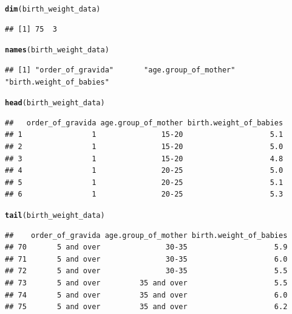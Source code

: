 \documentclass[11pt, a4paper]{article}\usepackage[]{graphicx}\usepackage[]{xcolor}
\makeatletter
\newcommand{\hlstd}[1]{\textcolor[rgb]{0.345,0.345,0.345}{#1}}%
\newcommand{\hlkwd}[1]{\textcolor[rgb]{0.737,0.353,0.396}{\textbf{#1}}}%
\newenvironment{kframe}{%
 \def\at@end@of@kframe{}%
 \ifinner\ifhmode%
  \def\at@end@of@kframe{\end{minipage}}%
  \begin{minipage}{\columnwidth}%
 \fi\fi%
 \def\FrameCommand##1{\hskip\@totalleftmargin \hskip-\fboxsep
 \colorbox{shadecolor}{##1}\hskip-\fboxsep
     \hskip-\linewidth \hskip-\@totalleftmargin \hskip\columnwidth}%
 \MakeFramed {\advance\hsize-\width
   \@totalleftmargin\z@ \linewidth\hsize
   \@setminipage}}%
 {\par\unskip\endMakeFramed%
 \at@end@of@kframe}
\newenvironment{knitrout}{}{} %
\makeatother
\begin{document}
\begin{knitrout}
\color{fgcolor}\begin{kframe}
\begin{alltt}
\hlkwd{dim}\hlstd{(birth_weight_data)}
\end{alltt}
\begin{verbatim}
## [1] 75  3
\end{verbatim}
\end{kframe}
\end{knitrout}

\begin{knitrout}
\color{fgcolor}\begin{kframe}
\begin{alltt}
\hlkwd{names}\hlstd{(birth_weight_data)}
\end{alltt}
\begin{verbatim}
## [1] "order_of_gravida"       "age.group_of_mother"    "birth.weight_of_babies"
\end{verbatim}
\end{kframe}
\end{knitrout}

\begin{knitrout}
\color{fgcolor}\begin{kframe}
\begin{alltt}
\hlkwd{head}\hlstd{(birth_weight_data)}
\end{alltt}
\begin{verbatim}
##   order_of_gravida age.group_of_mother birth.weight_of_babies
## 1                1               15-20                    5.1
## 2                1               15-20                    5.0
## 3                1               15-20                    4.8
## 4                1               20-25                    5.0
## 5                1               20-25                    5.1
## 6                1               20-25                    5.3
\end{verbatim}
\end{kframe}
\end{knitrout}

\begin{knitrout}
\color{fgcolor}\begin{kframe}
\begin{alltt}
\hlkwd{tail}\hlstd{(birth_weight_data)}
\end{alltt}
\begin{verbatim}
##    order_of_gravida age.group_of_mother birth.weight_of_babies
## 70       5 and over               30-35                    5.9
## 71       5 and over               30-35                    6.0
## 72       5 and over               30-35                    5.5
## 73       5 and over         35 and over                    5.5
## 74       5 and over         35 and over                    6.0
## 75       5 and over         35 and over                    6.2
\end{verbatim}
\end{kframe}
\end{knitrout}
\end{document}
